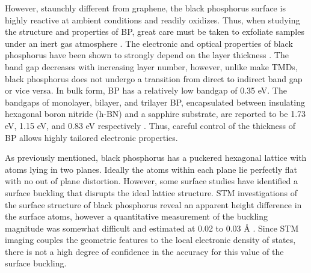 However, staunchly different from graphene, the black phosphorus surface is highly reactive at ambient conditions and readily oxidizes. Thus, when studying the structure and properties of BP, great care must be taken to exfoliate samples under an inert gas atmosphere \cite{BP-layers-gap}. The electronic and optical properties of black phosphorus have been shown to strongly depend on the layer thickness \cite{BP-layers-gap}. The band gap decreases with increasing layer number, however, unlike make TMDs, black phosphorus does not undergo a transition from direct to indirect band gap or vice versa. In bulk form, BP has a relatively low bandgap of 0.35 eV. The bandgaps of monolayer, bilayer, and trilayer BP, encapsulated between insulating hexagonal boron nitride (h-BN) and a sapphire substrate, are reported to be 1.73 eV, 1.15 eV, and 0.83 eV respectively \cite{BP-layers-gap}. Thus, careful control of the thickness of BP allows highly tailored electronic properties.


As previously mentioned, black phosphorus has a puckered hexagonal lattice with atoms lying in two planes. Ideally the atoms within each plane lie perfectly flat with no out of plane distortion. However, some surface studies have identified a surface buckling that disrupts the ideal lattice structure. STM investigations of the surface structure of black phosphorus reveal an apparent height difference in the surface atoms, however a quantitative measurement of the buckling magnitude was somewhat difficult and estimated at 0.02 to 0.03 {\AA} \cite{bp-buckle-stm}. Since STM imaging couples the geometric features to the local electronic density of states, there is not a high degree of confidence in the accuracy for this value of the surface buckling.


